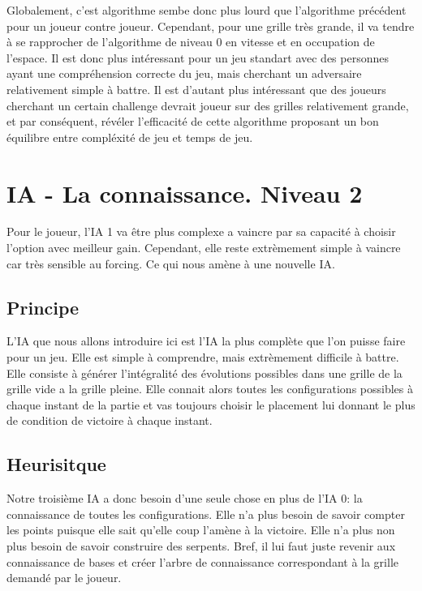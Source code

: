 \documentclass[a4paper,12pt]{report}
\begin{document}
Globalement, c'est algorithme sembe donc plus lourd que l'algorithme pr\'ec\'edent pour un joueur contre joueur. Cependant, pour une grille tr\`es grande, il va tendre \`a se rapprocher de l'algorithme de niveau 0 en vitesse et en occupation de l'espace. Il est donc plus int\'eressant pour un jeu standart avec des personnes ayant une compr\'ehension correcte du jeu, mais cherchant un adversaire relativement simple \`a battre. Il est d'autant plus int\'eressant que des joueurs cherchant un certain challenge devrait joueur sur des grilles relativement grande, et par cons\'equent, r\'ev\'eler l'efficacit\'e de cette algorithme proposant un bon \'equilibre entre compl\'exit\'e de jeu et temps de jeu.

\section{IA - La connaissance. Niveau 2}

Pour le joueur, l'IA 1 va \^etre plus complexe a vaincre par sa capacit\'e \`a choisir l'option avec meilleur gain. Cependant, elle reste extr\`emement simple \`a vaincre car tr\`es sensible au forcing. Ce qui nous am\`ene \`a une nouvelle IA. 

\subsection{Principe}

L'IA que nous allons introduire ici est l'IA la plus compl\`ete que l'on puisse faire pour un jeu. Elle est simple \`a comprendre, mais extr\`emement difficile \`a battre. Elle consiste \`a g\'en\'erer l'int\'egralit\'e des \'evolutions possibles dans une grille de la grille vide a la grille pleine. Elle connait alors toutes les configurations possibles \`a chaque instant de la partie et vas toujours choisir le placement lui donnant le plus de condition de victoire \`a chaque instant.

\subsection{Heurisitque}

Notre troisi\`eme IA a donc besoin d'une seule chose en plus de l'IA 0: la connaissance de toutes les configurations. Elle n'a plus besoin de savoir compter les points puisque elle sait qu'elle coup l'am\`ene \`a la victoire. Elle n'a plus non plus besoin de savoir construire des serpents. Bref, il lui faut juste revenir aux connaissance de bases et cr\'eer l'arbre de connaissance correspondant \`a la grille demand\'e par le joueur.
\end{document}
